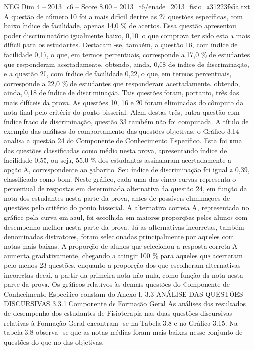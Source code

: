 \begin{textsample}{NEG Dim 4 – 2013\_c6 – Score 8.00 – 2013\_c6/enade\_2013\_fisio\_a31223fe5a.txt}
A questão de número 10 foi a mais difícil dentre as 27 questões específicas, com baixo índice de facilidade, apenas 14,0 \% de acertos.
Essa questão apresentou poder discriminatório igualmente baixo, 0,10, o que comprova ter sido esta a mais difícil para os estudantes.
Destacam -se, também, a questão 16, com índice de facilidade 0,17, o que, em termos percentuais, corresponde a 17,0 \% de estudantes que responderam acertadamente, obtendo, ainda, 0,08 de índice de discriminação, e a questão 20, com índice de facilidade 0,22, o que, em termos percentuais, corresponde a 22,0 \% de estudantes que responderam acertadamente, obtendo, ainda, 0,18 de índice de discriminação.
Tais questões foram, portanto, três das mais difíceis da prova.
As questões 10, 16 e 20 foram eliminadas do cômputo da nota final pelo critério do ponto bisserial.
Além destas três, outra questão com índice fraco de discriminação, questão 33 também não foi computada.
A título de exemplo das análises do comportamento das questões objetivas, o Gráfico 3.14 analisa a questão 24 do Componente de Conhecimento Específico.
Esta foi uma das questões classificadas como médio nesta prova, apresentando índice de facilidade 0,55, ou seja, 55,0 \% dos estudantes assinalaram acertadamente a opção A, correspondente ao gabarito.
Seu índice de discriminação foi igual a 0,39, classificado como bom.
Neste gráfico, cada uma das cinco curvas representa o percentual de respostas em determinada alternativa da questão 24, em função da nota dos estudantes nesta parte da prova, antes de possíveis eliminações de questões pelo critério do ponto bisserial.
A alternativa correta A, representada no gráfico pela curva em azul, foi escolhida em maiores proporções pelos alunos com desempenho melhor nesta parte da prova.
Já as alternativas incorretas, também denominadas distratores, foram selecionadas principalmente por aqueles com notas mais baixas.
A proporção de alunos que selecionou a resposta correta A aumenta gradativamente, chegando a atingir 100 \% para aqueles que acertaram pelo menos 23 questões, enquanto a proporção dos que escolheram alternativas incorretas decai, a partir da primeira nota não nula, como função da nota nesta parte da prova.
Os gráficos relativos às demais questões do Componente de Conhecimento Específico constam do Anexo I. 3.3 ANÁLISE DAS QUESTÕES DISCURSIVAS 3.3.1 Componente de Formação Geral As análises dos resultados de desempenho dos estudantes de Fisioterapia nas duas questões discursivas relativas à Formação Geral encontram -se na Tabela 3.8 e no Gráfico 3.15.
Na tabela 3.8 observa -se que as notas médias foram mais baixas nesse conjunto de questões do que no das objetivas.

\end{textsample}
